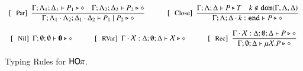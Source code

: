 \begin{figure}[!t]
\[\begin{array}{c}
		\trule{Par}~~\tree{
			\Gamma; \Lambda_{1}; \Delta_{1} \proves P_{1} \hastype \Proc \quad \Gamma; \Lambda_{2}; \Delta_{2} \proves P_{2} \hastype \Proc
		}{
			\Gamma; \Lambda_{1} \cat \Lambda_2; \Delta_{1} \cat \Delta_2 \proves P_1 \Par P_2 \hastype \Proc
		}
		\qquad\quad
		\trule{Close}~~\tree{
			\Gamma; \Lambda; \Delta  \proves P \hastype T \quad k \not\in \dom{\Gamma, \Lambda,\Delta}
		}{
			\Gamma; \Lambda; \Delta \cat k: \tinact  \proves P \hastype \Proc
		}
		\\[6mm]

		\trule{Nil}~~\Gamma; \emptyset; \emptyset \proves \inact \hastype \Proc
		\qquad \quad
		\trule{RVar}~~\Gamma \cat \rvar{X}: \Delta; \emptyset; \Delta  \proves \rvar{X} \hastype \Proc
		\qquad\quad 

	 	\trule{Rec}~~\tree{
			\Gamma \cat \rvar{X}: \Delta; \emptyset; \Delta  \proves P \hastype \Proc
		}{
			\Gamma ; \emptyset; \Delta  \proves \recp{X}{P} \hastype \Proc
		}


%
%
%
	\end{array}
\]
\caption{Typing Rules for $\mathsf{HO}\pi$.\label{fig:typerulesmy}}
\end{figure}
